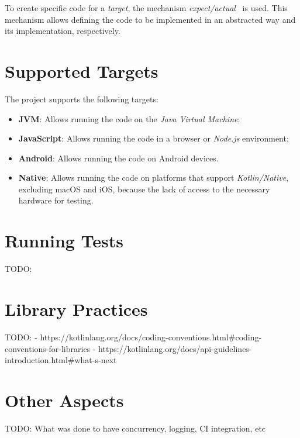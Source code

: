 To create specific code for a \textit{target}, the mechanism \textit{expect/actual}~\cite{kmp-expect-actual} is used.
This mechanism allows defining the code to be implemented in an abstracted way and its implementation, respectively.


\section{Supported Targets}\label{sec:supported-targets}

The project supports the following targets:

\begin{itemize}
    \item \textbf{JVM}: Allows running the code on the \textit{Java Virtual Machine};
    \item \textbf{JavaScript}: Allows running the code in a browser or \textit{Node.js} environment;
    \item \textbf{Android}: Allows running the code on Android devices.
    \item \textbf{Native}: Allows running the code on platforms that support \textit{Kotlin/Native}, excluding macOS and iOS, because the lack of access to the necessary hardware for testing.
\end{itemize}


\section{Running Tests}\label{sec:running-tests}
TODO:


\section{Library Practices}\label{sec:library-practices}
TODO:
- https://kotlinlang.org/docs/coding-conventions.html#coding-conventions-for-libraries
- https://kotlinlang.org/docs/api-guidelines-introduction.html#what-s-next


\section{Other Aspects}\label{sec:other-aspects}
TODO: What was done to have concurrency, logging, CI integration, etc
